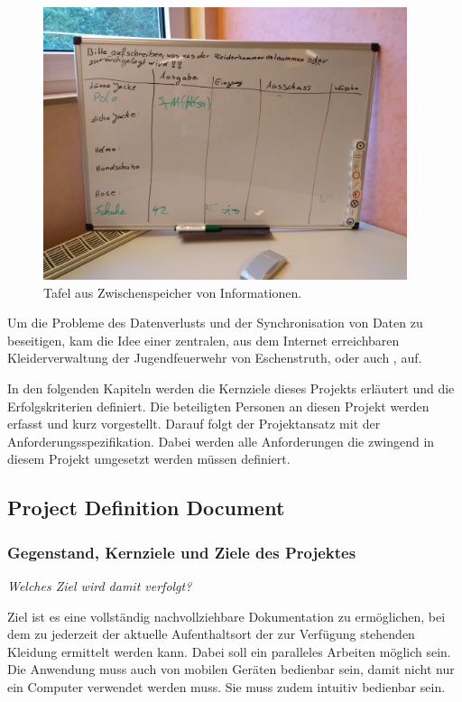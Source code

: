 \begin{figure}[hbtp]
  \centering
  \includegraphics[width=0.95\textwidth]{res/IMG_20180815_193814370}
  \caption{Tafel aus Zwischenspeicher von Informationen.}
  \label{fig:tafel}
\end{figure}

Um die Probleme des Datenverlusts und der Synchronisation von Daten zu beseitigen, kam die Idee einer zentralen, aus dem Internet erreichbaren Kleiderverwaltung der Jugendfeuerwehr von Eschenstruth, oder auch \project, auf.

In den folgenden Kapiteln werden die Kernziele dieses Projekts erläutert und die Erfolgskriterien definiert. Die beteiligten Personen an diesen Projekt werden erfasst und kurz vorgestellt. Darauf folgt der Projektansatz mit der Anforderungsspezifikation. Dabei werden alle Anforderungen die zwingend in diesem Projekt umgesetzt werden müssen definiert. 

\subsection{Project Definition Document}

\subsubsection{Gegenstand, Kernziele und Ziele des Projektes}

\textit{Welches Ziel wird damit verfolgt?}

Ziel ist es eine vollständig nachvollziehbare Dokumentation zu ermöglichen, bei dem zu jederzeit der aktuelle Aufenthaltsort der zur Verfügung stehenden Kleidung ermittelt werden kann. Dabei soll ein paralleles Arbeiten möglich sein. Die Anwendung muss auch von mobilen Geräten bedienbar sein, damit nicht nur ein Computer verwendet werden muss. Sie muss zudem intuitiv bedienbar sein. 

